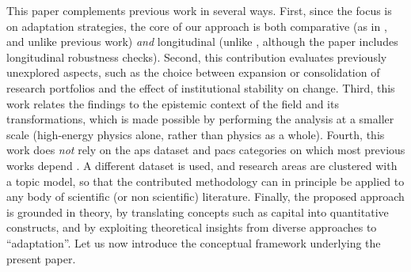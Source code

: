 \documentclass{article}
\begin{document}
This paper complements previous work in several ways. First, since the focus is on adaptation strategies, the core of our approach is both comparative (as in \citealt{Tripodi2020}, and unlike previous work) \textit{ and} longitudinal (unlike \citealt{Tripodi2020}, although the paper includes longitudinal robustness checks). Second, this contribution evaluates previously unexplored aspects, such as the choice between expansion or consolidation of research portfolios and the effect of institutional stability on change. %
Third, this work relates the findings to the epistemic context of the field and its transformations, which is made possible by performing the analysis at a smaller scale (high-energy physics alone, rather than physics as a whole). Fourth, this work does \textit{not} rely on the \gls{aps} dataset and \gls{pacs} categories on which most previous works depend \citep{Jia2017,Aleta2019,Battiston2019,Tripodi2020,Feifan2023}. A different dataset is used, and research areas are clustered with a topic model, so that the contributed methodology can in principle be applied to any body of scientific (or non scientific) literature. Finally, the proposed approach is grounded in theory, by translating concepts such as capital \citep{Bourdieu1980,Bourdieu1986} into quantitative constructs, and by exploiting theoretical insights from diverse approaches to ``adaptation''. Let us now introduce the conceptual framework underlying the present paper.
\end{document}
